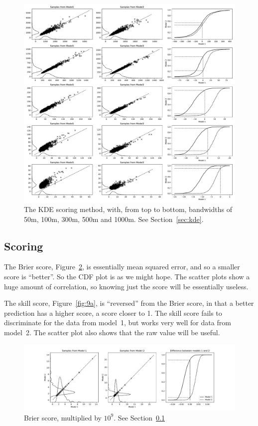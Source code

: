 \documentclass[twoside,a4paper,twocolumn,10pt]{article}
\theoremstyle{plain}
\theoremstyle{definition}
\begin{document}
\begin{figure}
  \includegraphics[width=\textwidth]{../details/kde1.pdf}
  \caption{The KDE scoring method, with, from top to bottom, bandwidths of 50m, 100m,
  300m, 500m and 1000m.  See Section~\ref{sec:kde}.}
   \label{fig:12a}
\end{figure}



\subsection{Scoring}\label{sec:scoring_synth}

The Brier score, Figure~\ref{fig:9}, is essentially mean squared error, and so
a smaller score is ``better''.  So the CDF plot is as we might hope.  The scatter plots
show a huge amount of correlation, so knowing just the score will be essentially useless.

The skill score, Figure~\ref{fig:9a}, is ``reversed'' from the Brier score, in that
a better prediction has a higher score, a score closer to 1.  The skill score
fails to discriminate for the data from model~1, but works very well for data from model~2.
The scatter plot also shows that the raw value will be useful.

\begin{figure}
  \includegraphics[width=\textwidth]{../details/brier.pdf}
  \caption{Brier score, multiplied by $10^9$.  See Section~\ref{sec:scoring_synth}}
   \label{fig:9}
\end{figure}
\end{document}
